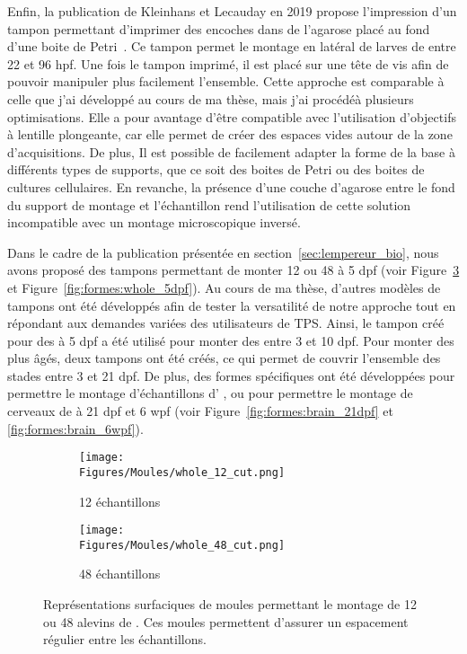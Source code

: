\documentclass[\main/main.tex]{subfiles}
\begin{document}
Enfin, la publication de Kleinhans et Lecauday en 2019 propose l'impression d'un tampon permettant d'imprimer des encoches dans de l'agarose placé au fond d'une boite de Petri~\cite{kleinhans_2019}.
%
Ce tampon permet le montage en latéral de larves de \pz entre 22 et 96 hpf.
%
Une fois le tampon imprimé, il est placé sur une tête de vis afin de pouvoir manipuler plus facilement l'ensemble.
%
Cette approche est comparable à celle que j'ai développé au cours de ma thèse, mais j'ai procédéà plusieurs optimisations.
%
Elle a pour avantage d'être compatible avec l'utilisation d'objectifs à lentille plongeante, car elle permet de créer des espaces vides autour de la zone d'acquisitions.
%
De plus, Il est possible de facilement adapter la forme de la base à différents types de supports, que ce soit des boites de Petri ou des boites de cultures cellulaires.
%
En revanche, la présence d'une couche d'agarose entre le fond du support de montage et l'échantillon rend l'utilisation de cette solution incompatible avec un montage microscopique inversé.

% 
Dans le cadre de la publication présentée en section~\ref{sec:lempereur_bio},
nous avons proposé des tampons permettant de monter 12 ou 48 \pzs{} à 5 dpf 
(voir Figure~\ref{fig:tampon} et Figure~\ref{fig:formes:whole_5dpf}).
%
Au cours de ma thèse, d'autres modèles de tampons ont été développés afin de tester la versatilité de notre approche tout en répondant aux demandes variées des utilisateurs de TPS.
%
Ainsi, le tampon créé pour des \pzs{} à 5 dpf a été utilisé pour monter des \pzs{} entre 3 et 10 dpf.
%
Pour monter des \pzs{} plus âgés, deux tampons ont été créés, ce qui permet de
couvrir l'ensemble des stades entre 3 et 21 dpf.
%
De plus, des formes spécifiques ont été développées pour permettre le montage d'échantillons
d' \ol{}, ou pour permettre le montage de cerveaux de \pz{} à 21 dpf et 6 wpf
(voir Figure~\ref{fig:formes:brain_21dpf} et \ref{fig:formes:brain_6wpf}).

\begin{figure}[htbp]
    \centering
    \begin{subfigure}[b]{0.57\textwidth}
       \caption{
            \label{fig:tampon:12}
            12 échantillons
            }
       \centering \texttt{[image: \\Figures/Moules/whole\_12\_cut.png]}
    \end{subfigure}
    \begin{subfigure}[b]{0.38\textwidth}
       \caption{
        \label{fig:tampon:48}
        48 échantillons
        }
       \centering \texttt{[image: \\Figures/Moules/whole\_48\_cut.png]}
    \end{subfigure}
    \caption{
        \label{fig:tampon}
        Représentations surfaciques de moules permettant le montage de 12 ou 48 alevins de \pzs{}.
        Ces moules permettent d'assurer un espacement régulier entre les échantillons.
    }
    
\end{figure}
\end{document}
